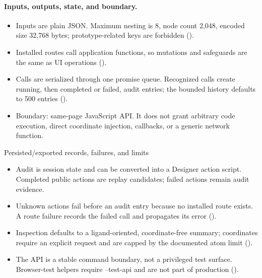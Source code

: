 \documentclass[11pt]{article}
\begin{document}
\begin{small}
\begin{itemize}[leftmargin=*]
\end{itemize}

\paragraph{Inputs, outputs, state, and boundary.}

\begin{itemize}[leftmargin=*]

\item Inputs are plain JSON. Maximum nesting is 8, node count 2,048, encoded size 32,768 bytes; prototype-related keys are forbidden ().

\item Installed routes call application functions, so mutations and safeguards are the same as UI operations ().

\item Calls are serialized through one promise queue. Recognized calls create running, then completed or failed, audit entries; the bounded history defaults to 500 entries ().

\item Boundary: same-page JavaScript API. It does not grant arbitrary code execution, direct coordinate injection, callbacks, or a generic network function.

\end{itemize}

Persisted/exported records, failures, and limits

\begin{itemize}[leftmargin=*]

\item Audit is session state and can be converted into a Designer action script. Completed public actions are replay candidates; failed actions remain audit evidence.

\item Unknown actions fail before an audit entry because no installed route exists. A route failure records the failed call and propagates its error ().

\item Inspection defaults to a ligand-oriented, coordinate-free summary; coordinates require an explicit request and are capped by the documented atom limit ().

\item The API is a stable command boundary, not a privileged test surface. Browser-test helpers require --test-api and are not part of production ().


\end{itemize}
\end{small}
\end{document}
